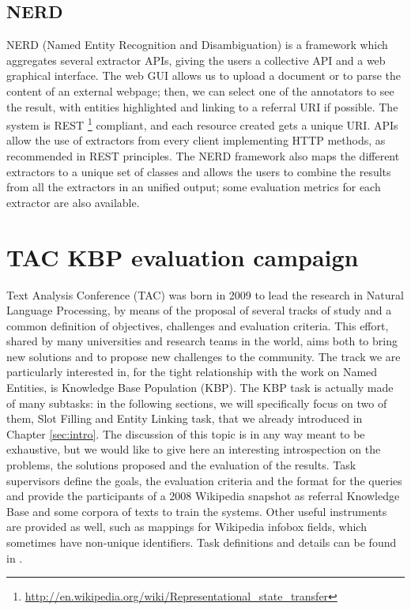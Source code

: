 \documentclass[a4paper,11pt]{report}
\begin{document}
\section{NERD}
NERD (Named Entity Recognition and Disambiguation) \cite{rizzo2012nerd} is a framework which aggregates several extractor APIs, giving the users a collective API and a web graphical interface.
The web GUI allows us to upload a document or to parse the content of an external webpage; then, we can select one of the annotators to see the result, with entities highlighted and linking to a referral URI if possible. The system is REST \footnote{\url{http://en.wikipedia.org/wiki/Representational_state_transfer}} compliant, and each resource created gets a unique URI. APIs allow the use of extractors from every client implementing HTTP methods, as recommended in REST principles.
The NERD framework also maps the different extractors to a unique set of classes and allows the users to combine the results from all the extractors in an unified output; some evaluation metrics for each extractor are also available.
\chapter{TAC KBP evaluation campaign}
\label{ch:tac}
Text Analysis Conference (TAC) was born in 2009 to lead the research in Natural Language Processing, by means of the proposal of several tracks of study and a common definition of objectives, challenges and evaluation criteria. This effort, shared by many universities and research teams in the world, aims both to bring new solutions and to propose new challenges to the community. The track we are particularly interested in, for the tight relationship with the work on Named Entities, is Knowledge Base Population (KBP).
The KBP task is actually made of many subtasks: in the following sections, we will specifically focus on two of them, Slot Filling and Entity Linking task, that we already introduced in Chapter \ref{sec:intro}. The discussion of this topic is in any way meant to be exhaustive, but we would like to give here an interesting introspection on the problems, the solutions proposed and the evaluation of the results.
Task supervisors define the goals, the evaluation criteria and the format for the queries and provide the participants of a 2008 Wikipedia snapshot as referral Knowledge Base and some corpora of texts to train the systems. Other useful instruments are provided as well, such as mappings for Wikipedia infobox fields, which sometimes have non-unique identifiers.
Task definitions and details can be found in \cite{tac2009, tac2010, tac2011, tac2012}.
\end{document}
